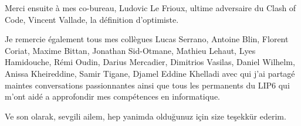 Merci ensuite à mes co-bureau, Ludovic Le Frioux, ultime adversaire du Clash of Code,
Vincent Vallade, la définition d'optimiste.

Je remercie également tous mes collègues 
Lucas Serrano,
Antoine Blin,
Florent Coriat,
Maxime Bittan,
Jonathan Sid-Otmane,
Mathieu Lehaut,
Lyes Hamidouche,
Rémi Oudin,
Darius Mercadier,
Dimitrios Vasilas, 
Daniel Wilhelm,
Anissa Kheireddine,
Samir Tigane,
Djamel Eddine Khelladi
avec qui j’ai partagé maintes conversations passionnantes 
ainsi que tous les permanents du LIP6 qui m'ont aidé a approfondir mes compétences en informatique.


Ve son olarak, sevgili ailem, hep yanimda olduğunuz için size teşekkür ederim.







